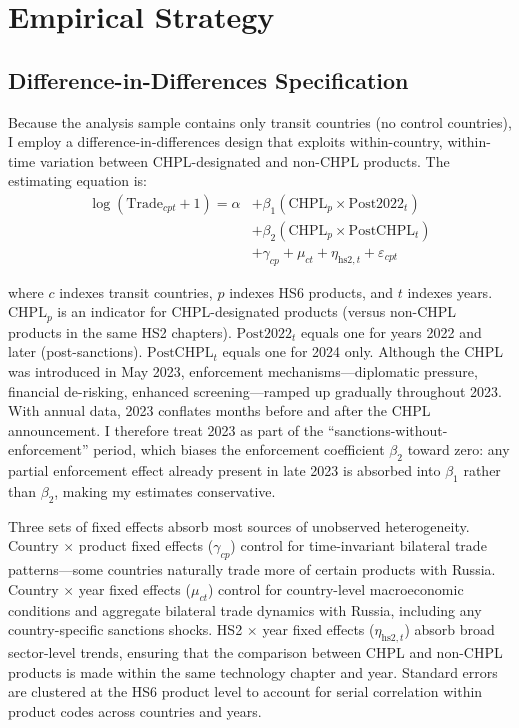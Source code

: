 \documentclass[12pt]{article}
\begin{document}
\section{Empirical Strategy}
\label{sec:strategy}

\subsection{Difference-in-Differences Specification}

Because the analysis sample contains only transit countries (no control countries), I employ a difference-in-differences design that exploits within-country, within-time variation between CHPL-designated and non-CHPL products. The estimating equation is:
\begin{align}
\log(\text{Trade}_{cpt} + 1) = \alpha &+ \beta_1 (\text{CHPL}_p \times \text{Post2022}_t) \nonumber \\
&+ \beta_2 (\text{CHPL}_p \times \text{PostCHPL}_t) \nonumber \\
&+ \gamma_{cp} + \mu_{ct} + \eta_{\text{hs2},t} + \varepsilon_{cpt}
\label{eq:dd}
\end{align}

where $c$ indexes transit countries, $p$ indexes HS6 products, and $t$ indexes years. $\text{CHPL}_p$ is an indicator for CHPL-designated products (versus non-CHPL products in the same HS2 chapters). $\text{Post2022}_t$ equals one for years 2022 and later (post-sanctions). $\text{PostCHPL}_t$ equals one for 2024 only. Although the CHPL was introduced in May 2023, enforcement mechanisms---diplomatic pressure, financial de-risking, enhanced screening---ramped up gradually throughout 2023. With annual data, 2023 conflates months before and after the CHPL announcement. I therefore treat 2023 as part of the ``sanctions-without-enforcement'' period, which biases the enforcement coefficient $\beta_2$ toward zero: any partial enforcement effect already present in late 2023 is absorbed into $\beta_1$ rather than $\beta_2$, making my estimates conservative.

Three sets of fixed effects absorb most sources of unobserved heterogeneity. Country $\times$ product fixed effects ($\gamma_{cp}$) control for time-invariant bilateral trade patterns---some countries naturally trade more of certain products with Russia. Country $\times$ year fixed effects ($\mu_{ct}$) control for country-level macroeconomic conditions and aggregate bilateral trade dynamics with Russia, including any country-specific sanctions shocks. HS2 $\times$ year fixed effects ($\eta_{\text{hs2},t}$) absorb broad sector-level trends, ensuring that the comparison between CHPL and non-CHPL products is made within the same technology chapter and year. Standard errors are clustered at the HS6 product level to account for serial correlation within product codes across countries and years.
\end{document}
